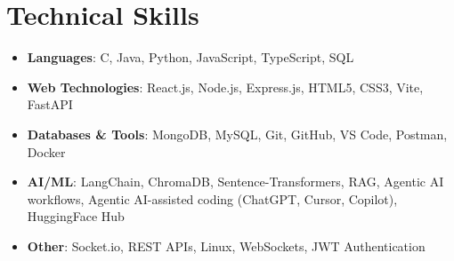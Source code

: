 \documentclass[letterpaper,11pt]{article}
\begin{document}
\section{Technical Skills}
 \begin{itemize}[leftmargin=0.15in, label={}]
    \small
    \item \textbf{Languages}{: C, Java, Python, JavaScript, TypeScript, SQL} \\
    \item \textbf{Web Technologies}{: React.js, Node.js, Express.js, HTML5, CSS3, Vite, FastAPI} \\
    \item \textbf{Databases \& Tools}{: MongoDB, MySQL, Git, GitHub, VS Code, Postman, Docker} \\
    \item \textbf{AI/ML}{: LangChain, ChromaDB, Sentence-Transformers, RAG, Agentic AI workflows, Agentic AI-assisted coding (ChatGPT, Cursor, Copilot), HuggingFace Hub} \\
    \item \textbf{Other}{: Socket.io, REST APIs, Linux, WebSockets, JWT Authentication}
 \end{itemize}
  \vspace{4pt}
\end{document}
